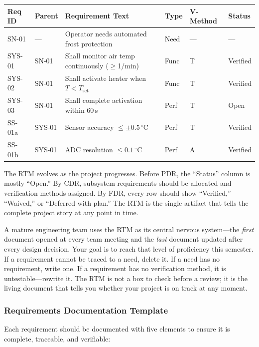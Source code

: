 \documentclass[11pt,letterpaper,twoside,openany]{book}
\newcommand{\degC}{\ensuremath{{}^{\circ}\text{C}}}
\begin{document}
\begin{center}
\small
\begin{tabularx}{\textwidth}{l l X l l l}
\toprule
\textbf{Req ID} & \textbf{Parent} & \textbf{Requirement Text} & \textbf{Type} & \textbf{V-Method} & \textbf{Status} \\
\midrule
SN-01 & --- & Operator needs automated frost protection & Need & --- & --- \\
SYS-01 & SN-01 & Shall monitor air temp continuously ($\geq$1/min) & Func & T & Verified \\
SYS-02 & SN-01 & Shall activate heater when $T < T_{\text{set}}$ & Func & T & Verified \\
SYS-03 & SN-01 & Shall complete activation within 60\,s & Perf & T & Open \\
SS-01a & SYS-01 & Sensor accuracy $\leq \pm 0.5$\,\degC & Perf & T & Verified \\
SS-01b & SYS-01 & ADC resolution $\leq 0.1$\,\degC & Perf & A & Verified \\
\bottomrule
\end{tabularx}
\end{center}

The RTM evolves as the project progresses. Before PDR, the ``Status'' column is mostly ``Open.'' By CDR, subsystem requirements should be allocated and verification methods assigned. By FDR, every row should show ``Verified,'' ``Waived,'' or ``Deferred with plan.'' The RTM is the single artifact that tells the complete project story at any point in time.

\begin{warningbox}
A mature engineering team uses the RTM as its central nervous system---the \emph{first} document opened at every team meeting and the \emph{last} document updated after every design decision. Your goal is to reach that level of proficiency this semester. If a requirement cannot be traced to a need, delete it. If a need has no requirement, write one. If a requirement has no verification method, it is untestable---rewrite it. The RTM is not a box to check before a review; it is the living document that tells you whether your project is on track at any moment.
\end{warningbox}

\subsubsection{Requirements Documentation Template}
Each requirement should be documented with five elements to ensure it is complete, traceable, and verifiable:
\end{document}

